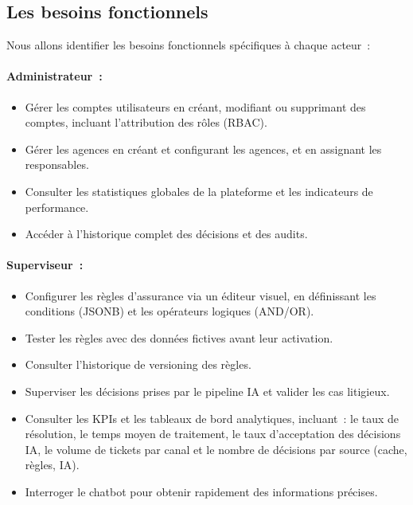 \subsection{Les besoins fonctionnels}

Nous allons identifier les besoins fonctionnels sp\'{e}cifiques \`{a} chaque acteur~:

\paragraph{Administrateur~:}

\begin{itemize}[label=---]
    \item G\'{e}rer les comptes utilisateurs en cr\'{e}ant, modifiant ou supprimant des comptes, incluant l'attribution des r\^{o}les (RBAC).
    \item G\'{e}rer les agences en cr\'{e}ant et configurant les agences, et en assignant les responsables.
    \item Consulter les statistiques globales de la plateforme et les indicateurs de performance.
    \item Acc\'{e}der \`{a} l'historique complet des d\'{e}cisions et des audits.
\end{itemize}

\paragraph{Superviseur~:}

\begin{itemize}[label=---]
    \item Configurer les r\`{e}gles d'assurance via un \'{e}diteur visuel, en d\'{e}finissant les conditions (JSONB) et les op\'{e}rateurs logiques (AND/OR).
    \item Tester les r\`{e}gles avec des donn\'{e}es fictives avant leur activation.
    \item Consulter l'historique de versioning des r\`{e}gles.
    \item Superviser les d\'{e}cisions prises par le pipeline IA et valider les cas litigieux.
    \item Consulter les KPIs et les tableaux de bord analytiques, incluant~: le taux de r\'{e}solution, le temps moyen de traitement, le taux d'acceptation des d\'{e}cisions IA, le volume de tickets par canal et le nombre de d\'{e}cisions par source (cache, r\`{e}gles, IA).
    \item Interroger le chatbot pour obtenir rapidement des informations pr\'{e}cises.
\end{itemize}

